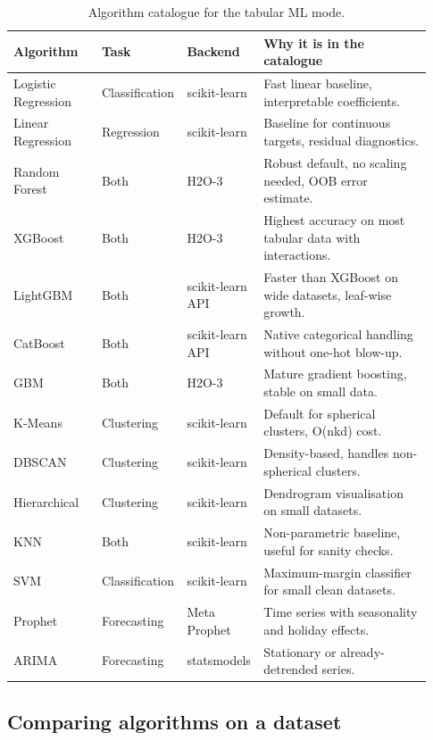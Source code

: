 \documentclass[12pt, a4paper, oneside]{report}
\begin{document}
\begin{table}[H]
\centering
\caption{Algorithm catalogue for the tabular ML mode.}
\label{tab:ml_algos}
\begin{tabular}{|L{0.21\linewidth}|L{0.16\linewidth}|L{0.16\linewidth}|L{0.4\linewidth}|}
\hline
\textbf{Algorithm} & \textbf{Task} & \textbf{Backend} & \textbf{Why it is in the catalogue} \\
\hline
Logistic Regression & Classification & scikit-learn & Fast linear baseline, interpretable coefficients. \\ \hline
Linear Regression & Regression & scikit-learn & Baseline for continuous targets, residual diagnostics. \\ \hline
Random Forest & Both & H2O-3 & Robust default, no scaling needed, OOB error estimate. \\ \hline
XGBoost & Both & H2O-3 & Highest accuracy on most tabular data with interactions. \\ \hline
LightGBM & Both & scikit-learn API & Faster than XGBoost on wide datasets, leaf-wise growth. \\ \hline
CatBoost & Both & scikit-learn API & Native categorical handling without one-hot blow-up. \\ \hline
GBM & Both & H2O-3 & Mature gradient boosting, stable on small data. \\ \hline
K-Means & Clustering & scikit-learn & Default for spherical clusters, O(nkd) cost. \\ \hline
DBSCAN & Clustering & scikit-learn & Density-based, handles non-spherical clusters. \\ \hline
Hierarchical & Clustering & scikit-learn & Dendrogram visualisation on small datasets. \\ \hline
KNN & Both & scikit-learn & Non-parametric baseline, useful for sanity checks. \\ \hline
SVM & Classification & scikit-learn & Maximum-margin classifier for small clean datasets. \\ \hline
Prophet & Forecasting & Meta Prophet & Time series with seasonality and holiday effects. \\ \hline
ARIMA & Forecasting & statsmodels & Stationary or already-detrended series. \\
\hline
\end{tabular}
\end{table}

\subsection{Comparing algorithms on a dataset}
\end{document}

